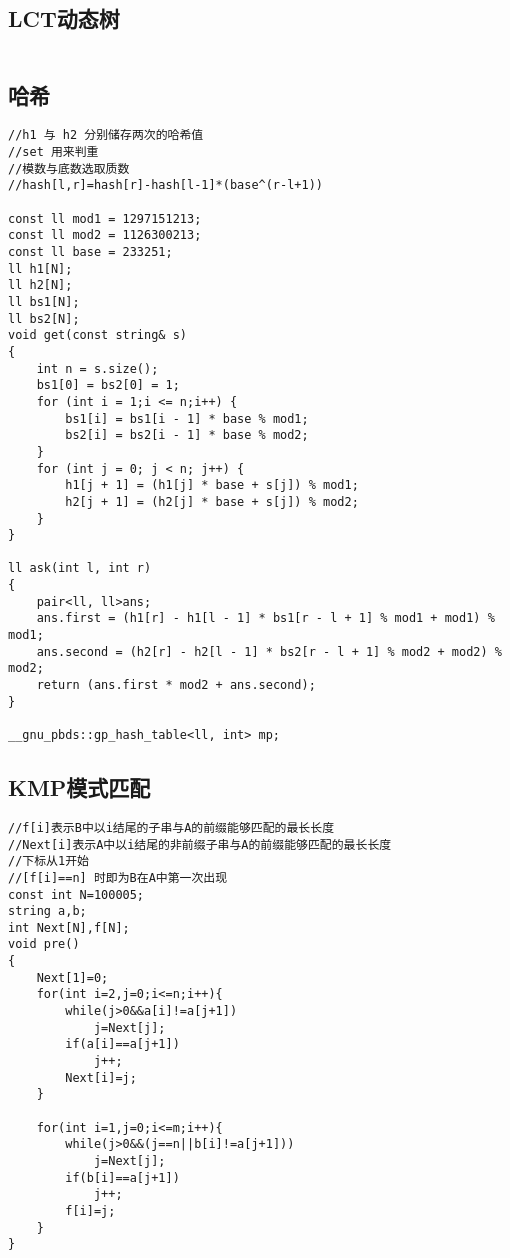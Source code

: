 \documentclass[twocolumn,a4]{article}
\begin{document}
\subsection{LCT动态树}
\begin{lstlisting}

\end{lstlisting}

\subsection{哈希}
\begin{lstlisting}
//h1 与 h2 分别储存两次的哈希值
//set 用来判重
//模数与底数选取质数
//hash[l,r]=hash[r]-hash[l-1]*(base^(r-l+1))

const ll mod1 = 1297151213;
const ll mod2 = 1126300213;
const ll base = 233251;
ll h1[N];
ll h2[N];
ll bs1[N];
ll bs2[N];
void get(const string& s)
{
    int n = s.size();
    bs1[0] = bs2[0] = 1;
    for (int i = 1;i <= n;i++) {
        bs1[i] = bs1[i - 1] * base % mod1;
        bs2[i] = bs2[i - 1] * base % mod2;
    }
    for (int j = 0; j < n; j++) {
        h1[j + 1] = (h1[j] * base + s[j]) % mod1;
        h2[j + 1] = (h2[j] * base + s[j]) % mod2;
    }
}

ll ask(int l, int r)
{
    pair<ll, ll>ans;
    ans.first = (h1[r] - h1[l - 1] * bs1[r - l + 1] % mod1 + mod1) % mod1;
    ans.second = (h2[r] - h2[l - 1] * bs2[r - l + 1] % mod2 + mod2) % mod2;
    return (ans.first * mod2 + ans.second);
}

__gnu_pbds::gp_hash_table<ll, int> mp;
\end{lstlisting}

\subsection{KMP模式匹配}
\begin{lstlisting}
//f[i]表示B中以i结尾的子串与A的前缀能够匹配的最长长度
//Next[i]表示A中以i结尾的非前缀子串与A的前缀能够匹配的最长长度
//下标从1开始
//[f[i]==n] 时即为B在A中第一次出现
const int N=100005;
string a,b;
int Next[N],f[N];
void pre()
{
    Next[1]=0;
    for(int i=2,j=0;i<=n;i++){
        while(j>0&&a[i]!=a[j+1])
            j=Next[j];
        if(a[i]==a[j+1])
            j++;
        Next[i]=j;
    }

    for(int i=1,j=0;i<=m;i++){
        while(j>0&&(j==n||b[i]!=a[j+1]))
            j=Next[j];
        if(b[i]==a[j+1])
            j++;
        f[i]=j;
    }
}
\end{lstlisting}
\end{document}
